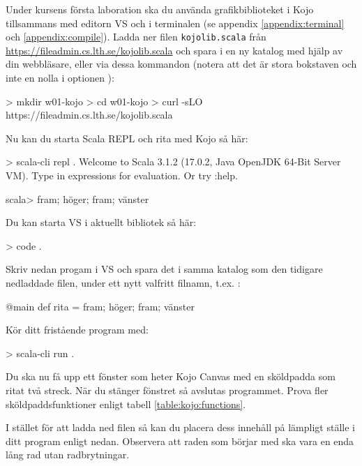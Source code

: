 Under kursens första laboration ska du använda grafikbiblioteket i Kojo tillsammans med editorn VS  och  i terminalen (se appendix \ref{appendix:terminal} och \ref{appendix:compile}). Ladda ner filen \texttt{kojolib.scala} från \url{https://fileadmin.cs.lth.se/kojolib.scala} och spara i en ny katalog med hjälp av din webbläsare, eller via dessa kommandon (notera att det är stora bokstaven  och inte en nolla i optionen ):

\begin{REPLnonum}
> mkdir w01-kojo
> cd w01-kojo
> curl -sLO https://fileadmin.cs.lth.se/kojolib.scala
\end{REPLnonum}

Nu kan du starta Scala REPL och rita med Kojo så här:

\begin{REPLnonum}
> scala-cli repl .
Welcome to Scala 3.1.2 (17.0.2, Java OpenJDK 64-Bit Server VM).
Type in expressions for evaluation. Or try :help.
                                                                                                                               
scala> fram; höger; fram; vänster

\end{REPLnonum}

Du kan starta VS  i aktuellt bibliotek så här:
\begin{REPLnonum}
> code .
\end{REPLnonum}

Skriv nedan progam i VS  och spara det i samma katalog som den tidigare nedladdade filen, under ett nytt valfritt filnamn, t.ex. :

\begin{Code}
@main def rita = { fram; höger; fram; vänster }
\end{Code}

Kör ditt fristående program med:
\begin{REPLnonum}
> scala-cli run .
\end{REPLnonum}

Du ska nu få upp ett fönster som heter Kojo Canvas med en sköldpadda som ritat två streck. När du stänger fönstret så avslutas programmet. Prova fler sköldpaddsfunktioner enligt tabell \ref{table:kojo:functions}.

I stället för att ladda ned filen  så kan du placera dess innehåll på lämpligt ställe i ditt program enligt nedan. Observera att raden som börjar med  ska vara en enda lång rad utan radbrytningar.%


